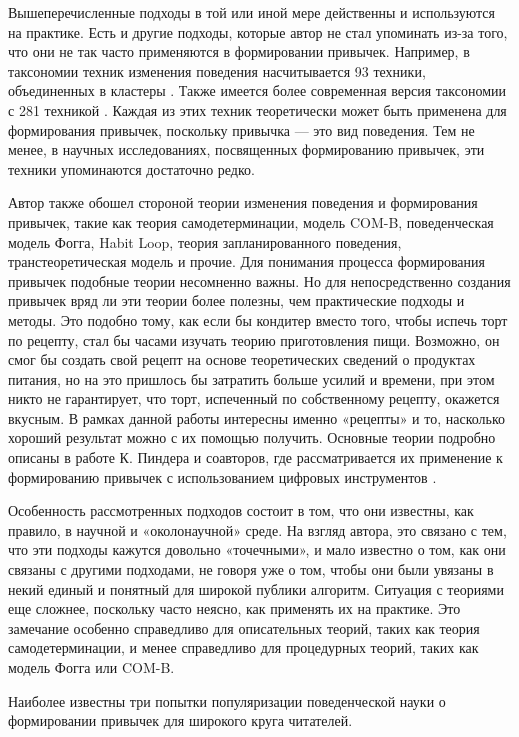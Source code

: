 \documentclass[pdflatex,sn-mathphys-num]{sn-jnl}%
\theoremstyle{thmstyleone}%
\theoremstyle{thmstyletwo}%
\theoremstyle{thmstylethree}%
\begin{document}
Вышеперечисленные подходы в той или иной мере действенны и используются на практике. Есть и другие подходы, которые автор не стал упоминать из-за того, что они не так часто применяются в формировании привычек. Например, в таксономии техник изменения поведения насчитывается 93 техники, объединенных в кластеры \cite{michie_2008_bct}. Также имеется более современная версия таксономии с 281 техникой \cite{ontology_bct}. Каждая из этих техник теоретически может быть применена для формирования привычек, поскольку привычка — это вид поведения. Тем не менее, в научных исследованиях, посвященных формированию привычек, эти техники упоминаются достаточно редко.

Автор также обошел стороной теории изменения поведения и формирования привычек, такие как теория самодетерминации, модель COM-B, поведенческая модель Фогга, Habit Loop, теория запланированного поведения, транстеоретическая модель и прочие. Для понимания процесса формирования привычек подобные теории несомненно важны. Но для непосредственно создания привычек вряд ли эти теории более полезны, чем практические подходы и методы. Это подобно тому, как если бы кондитер вместо того, чтобы испечь торт по рецепту, стал бы часами изучать теорию приготовления пищи. Возможно, он смог бы создать свой рецепт на основе теоретических сведений о продуктах питания, но на это пришлось бы затратить больше усилий и времени, при этом никто не гарантирует, что торт, испеченный по собственному рецепту, окажется вкусным. В рамках данной работы интересны именно «рецепты» и то, насколько хороший результат можно с их помощью получить. Основные теории подробно описаны в работе К. Пиндера и соавторов, где рассматривается их применение к формированию привычек с использованием цифровых инструментов \cite{10.1145/3196830}.

Особенность рассмотренных подходов состоит в том, что они известны, как правило, в научной и «околонаучной» среде. На взгляд автора, это связано с тем, что эти подходы кажутся довольно «точечными», и мало известно о том, как они связаны с другими подходами, не говоря уже о том, чтобы они были увязаны в некий единый и понятный для широкой публики алгоритм. Ситуация с теориями еще сложнее, поскольку часто неясно, как применять их на практике. Это замечание особенно справедливо для описательных теорий, таких как теория самодетерминации, и менее справедливо для процедурных теорий, таких как модель Фогга или COM-B.

Наиболее известны три попытки популяризации поведенческой науки о формировании привычек для широкого круга читателей.
\end{document}
